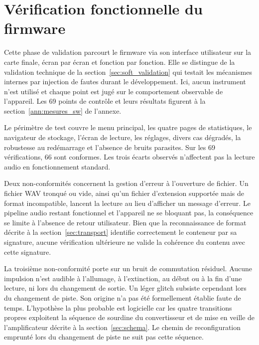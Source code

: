 \section{Vérification fonctionnelle du firmware}
\label{sec:res_firmware}

Cette phase de validation parcourt le firmware via son interface utilisateur sur la carte finale, écran par écran et fonction par fonction. Elle se distingue de la validation technique de la section~\ref{sec:soft_validation} qui testait les mécanismes internes par injection de fautes durant le développement. Ici, aucun instrument n'est utilisé et chaque point est jugé sur le comportement observable de l'appareil. Les 69 points de contrôle et leurs résultats figurent à la section~\ref{ann:mesures_sw} de l'annexe.

Le périmètre de test couvre le menu principal, les quatre pages de statistiques, le navigateur de stockage, l'écran de lecture, les réglages, divers cas dégradés, la robustesse au redémarrage et l'absence de bruits parasites. Sur les 69 vérifications, 66 sont conformes. Les trois écarts observés n'affectent pas la lecture audio en fonctionnement standard.

Deux non-conformités concernent la gestion d'erreur à l'ouverture de fichier. Un fichier WAV tronqué ou vide, ainsi qu'un fichier d'extension supportée mais de format incompatible, lancent la lecture au lieu d'afficher un message d'erreur. Le pipeline audio restant fonctionnel et l'appareil ne se bloquant pas, la conséquence se limite à l'absence de retour utilisateur. Bien que la reconnaissance de format décrite à la section~\ref{sec:transport} identifie correctement le conteneur par sa signature, aucune vérification ultérieure ne valide la cohérence du contenu avec cette signature.

La troisième non-conformité porte sur un bruit de commutation résiduel. Aucune impulsion n'est audible à l'allumage, à l'extinction, au début ou à la fin d'une lecture, ni lors du changement de sortie. Un léger glitch subsiste cependant lors du changement de piste. Son origine n'a pas été formellement établie faute de temps. L'hypothèse la plus probable est logicielle car les quatre transitions propres exploitent la séquence de sourdine du convertisseur et de mise en veille de l'amplificateur décrite à la section~\ref{sec:schema}. Le chemin de reconfiguration emprunté lors du changement de piste ne suit pas cette séquence.